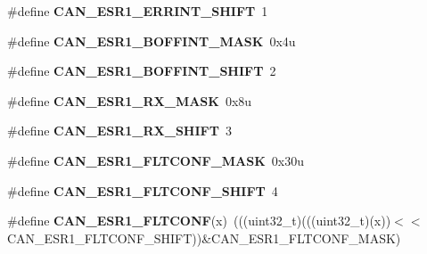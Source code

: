 \begin{DoxyCompactItemize}
\item 
\#define {\bfseries C\+A\+N\+\_\+\+E\+S\+R1\+\_\+\+E\+R\+R\+I\+N\+T\+\_\+\+S\+H\+I\+FT}~1\hypertarget{group__CAN__Register__Masks_gacee94f8f13909a6e02234076eecda564}{}\label{group__CAN__Register__Masks_gacee94f8f13909a6e02234076eecda564}

\item 
\#define {\bfseries C\+A\+N\+\_\+\+E\+S\+R1\+\_\+\+B\+O\+F\+F\+I\+N\+T\+\_\+\+M\+A\+SK}~0x4u\hypertarget{group__CAN__Register__Masks_ga0f997f1d2ad00476745755aa74ce5084}{}\label{group__CAN__Register__Masks_ga0f997f1d2ad00476745755aa74ce5084}

\item 
\#define {\bfseries C\+A\+N\+\_\+\+E\+S\+R1\+\_\+\+B\+O\+F\+F\+I\+N\+T\+\_\+\+S\+H\+I\+FT}~2\hypertarget{group__CAN__Register__Masks_ga5e04e60e6627e38eaf02023308703a2e}{}\label{group__CAN__Register__Masks_ga5e04e60e6627e38eaf02023308703a2e}

\item 
\#define {\bfseries C\+A\+N\+\_\+\+E\+S\+R1\+\_\+\+R\+X\+\_\+\+M\+A\+SK}~0x8u\hypertarget{group__CAN__Register__Masks_ga246ad2ff9dd50d1d6b931b5e42ef90b3}{}\label{group__CAN__Register__Masks_ga246ad2ff9dd50d1d6b931b5e42ef90b3}

\item 
\#define {\bfseries C\+A\+N\+\_\+\+E\+S\+R1\+\_\+\+R\+X\+\_\+\+S\+H\+I\+FT}~3\hypertarget{group__CAN__Register__Masks_ga5f5f765579cea7bfb561f84e62b96623}{}\label{group__CAN__Register__Masks_ga5f5f765579cea7bfb561f84e62b96623}

\item 
\#define {\bfseries C\+A\+N\+\_\+\+E\+S\+R1\+\_\+\+F\+L\+T\+C\+O\+N\+F\+\_\+\+M\+A\+SK}~0x30u\hypertarget{group__CAN__Register__Masks_ga6c81fa9d3bec21a97a304319968216a8}{}\label{group__CAN__Register__Masks_ga6c81fa9d3bec21a97a304319968216a8}

\item 
\#define {\bfseries C\+A\+N\+\_\+\+E\+S\+R1\+\_\+\+F\+L\+T\+C\+O\+N\+F\+\_\+\+S\+H\+I\+FT}~4\hypertarget{group__CAN__Register__Masks_gadb93c702b83c1240d7b1a07fba1b33a3}{}\label{group__CAN__Register__Masks_gadb93c702b83c1240d7b1a07fba1b33a3}

\item 
\#define {\bfseries C\+A\+N\+\_\+\+E\+S\+R1\+\_\+\+F\+L\+T\+C\+O\+NF}(x)~(((uint32\+\_\+t)(((uint32\+\_\+t)(x))$<$$<$C\+A\+N\+\_\+\+E\+S\+R1\+\_\+\+F\+L\+T\+C\+O\+N\+F\+\_\+\+S\+H\+I\+FT))\&C\+A\+N\+\_\+\+E\+S\+R1\+\_\+\+F\+L\+T\+C\+O\+N\+F\+\_\+\+M\+A\+SK)\hypertarget{group__CAN__Register__Masks_ga280fd558442e907a131d0156629c9a9c}{}\label{group__CAN__Register__Masks_ga280fd558442e907a131d0156629c9a9c}


\end{DoxyCompactItemize}
